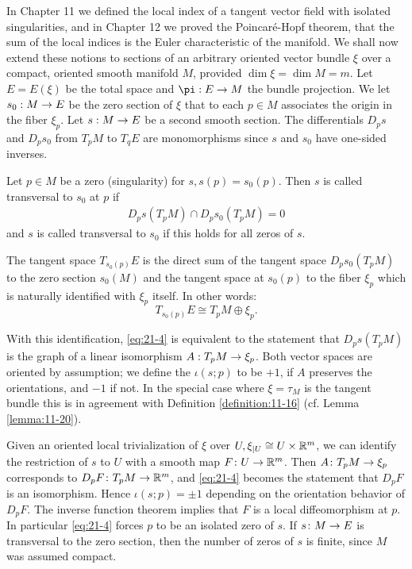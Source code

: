 In Chapter 11 we defined the local index of a tangent vector field with isolated singularities, and in Chapter 12 
we proved the Poincaré-Hopf theorem, that the sum of the local indices is the Euler characteristic of the 
manifold. We shall now extend these notions to sections of an arbitrary oriented vector bundle $\xi$ over a 
compact, oriented smooth manifold $M$, provided $\dim \xi  = \dim M = m$. Let $E = E( \xi )$ be the total 
space and $\pi  : E \ra  M$ the bundle projection. We let ${s}_{0} : M \rightarrow  E$ be the zero section of $\xi$ 
that to each $p \in  M$ associates the origin in the fiber ${\xi }_{p}$. Let $s : M \rightarrow  E$ be a second smooth 
section. The differentials ${D}_{p}s$ and ${D}_{p}{s}_{0}$ from ${T}_{p}M$ to ${T}_{q}E$ are monomorphisms 
since $s$ and ${s}_{0}$ have one-sided inverses.

\begin{definition}\label{definition:21-8}
  Let $p \in  M$ be a zero (singularity) for $s,s( p)  = {s}_{0}( p)$. Then $s$ is called transversal to ${s}_{0}$ at $p$ if
  \begin{align}\label{eq:21-4}
    {D}_{p}s( {{T}_{p}M})  \cap  {D}_{p}{s}_{0}( {{T}_{p}M})  = 0
  \end{align}
  and $s$ is called transversal to ${s}_{0}$ if this holds for all zeros of $s$.
\end{definition}

The tangent space ${T}_{{s}_{0}( p) }E$ is the direct sum of the tangent space ${D}_{p}{s}_{0}( {{T}_{p}M})$ to 
the zero section ${s}_{0}( M)$ and the tangent space at ${s}_{0}( p)$ to the fiber ${\xi }_{p}$ which is naturally 
identified with ${\xi }_{p}$ itself. In other words:
\[
  {T}_{{s}_{0}( p) }E \cong  {T}_{p}M \oplus  {\xi }_{p}.
\]

With this identification, \eqref{eq:21-4} is equivalent to the statement that ${D}_{p}s( {{T}_{p}M})$ is the graph of 
a linear isomorphism $A : {T}_{p}M \rightarrow  {\xi }_{p}$. Both vector spaces are oriented by assumption; we define 
the  $\iota ( {s;p})$ to be $+1$, if $A$ preserves the orientations, and $-1$ if not. In the special 
case where $\xi  = {\tau }_{M}$ is the tangent bundle this is in agreement with Definition \ref{definition:11-16} 
(cf. Lemma \ref{lemma:11-20}).

Given an oriented local trivialization of $\xi$ over $U,{\xi }_{\mid U} \cong  U \times  {{\ensuremath{\mathbb{R}}}}^{m}$, we can 
identify the restriction of $s$ to $U$ with a smooth map $F\colon U \rightarrow  {{\ensuremath{\mathbb{R}}}}^{m}$. Then $A\colon {T}_{p}M \rightarrow  {\xi }_{p}$ 
corresponds to ${D}_{p}F\colon {T}_{p}M \rightarrow  {{\ensuremath{\mathbb{R}}}}^{m}$, and \eqref{eq:21-4} becomes the statement that ${D}_{p}F$ is an isomorphism. 
Hence $\iota ( {s;p})  =  \pm  1$ depending on the orientation behavior of ${D}_{p}F$. The inverse function theorem 
implies that $F$ is a local diffeomorphism at $p$. In particular \eqref{eq:21-4} forces $p$ to be an isolated zero of $s$. 
If $s\colon M \rightarrow  E$ is transversal to the zero section, then the number of zeros of $s$ is finite, since $M$ was 
assumed compact.

